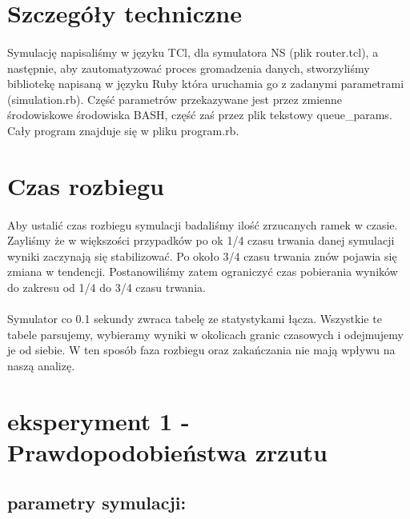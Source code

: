 \documentclass[a4paper]{article}
\begin{document}
\section{Szczegóły techniczne}


\paragraph{}
Symulację napisaliśmy w języku TCl, dla symulatora NS (plik router.tcl), a następnie, aby zautomatyzować proces gromadzenia danych, stworzyliśmy bibliotekę napisaną w języku Ruby która uruchamia go z zadanymi parametrami (simulation.rb). Część parametrów przekazywane jest przez zmienne środowiskowe środowiska BASH, część zaś przez plik tekstowy queue\_params. Cały program znajduje się w pliku program.rb.


\section{Czas rozbiegu}

\paragraph{}
Aby ustalić czas rozbiegu symulacji badaliśmy ilość zrzucanych ramek w czasie. Zayliśmy że w większości przypadków po ok 1/4 czasu trwania danej symulacji wyniki zaczynają się stabilizować. Po około 3/4 czasu trwania znów pojawia się zmiana w tendencji. Postanowiliśmy zatem ograniczyć czas pobierania wyników do zakresu od 1/4 do 3/4 czasu trwania.

\paragraph{}
Symulator co 0.1 sekundy zwraca tabelę ze statystykami łącza. Wszystkie te tabele parsujemy, wybieramy wyniki w okolicach granic czasowych i odejmujemy je od siebie. W ten sposób faza rozbiegu oraz zakańczania nie mają wpływu na naszą analizę.


\section{eksperyment 1 - Prawdopodobieństwa zrzutu}



\subsection{parametry symulacji:}
\end{document}
